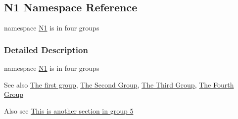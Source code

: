 \hypertarget{namespace_n1}{}\subsection{N1 Namespace Reference}
\label{namespace_n1}


namespace \hyperlink{namespace_n1}{N1} is in four groups  




\subsubsection{Detailed Description}
namespace \hyperlink{namespace_n1}{N1} is in four groups 

\begin{DoxySeeAlso}{See also}
\hyperlink{group__group1}{The first group}, \hyperlink{group__group2}{The Second Group}, \hyperlink{group__group3}{The Third Group}, \hyperlink{group__group4}{The Fourth Group}
\end{DoxySeeAlso}
Also see \hyperlink{group__group5}{This is another section in group 5} 